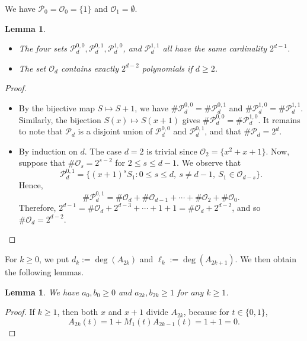 \documentclass [12pt]{article}
\newtheorem{lemma}[theorem]{Lemma}
\begin{document}
We have ${\mathcal{P}}_0 = {\mathcal{O}}_0 = \{1\}$ and ${\mathcal{O}}_1 = \emptyset$.

\begin{lemma} \label{oddpolyn}
\begin{itemize}
    \item[i)] The four sets ${\mathcal{P}}^{0,0}_d, {\mathcal{P}}^{0,1}_d, {\mathcal{P}}^{1,0}_d$, and ${\mathcal{P}}^{1,1}_d$ all have the same cardinality $2^{d-1}$.
    \item[ii)] The set ${\mathcal{O}}_d$ contains exactly $2^{d-2}$ polynomials if $d \geq 2$.
\end{itemize}
\end{lemma}

\begin{proof}
\begin{itemize}
    \item[i)] By the bijective map $S \mapsto S+1$, we have $\# {\mathcal{P}}^{0,0}_d = \# {\mathcal{P}}^{0,1}_d$ and $\# {\mathcal{P}}^{1,0}_d = \# {\mathcal{P}}^{1,1}_d$. Similarly, the bijection $S(x) \mapsto S(x+1)$ gives $\# {\mathcal{P}}^{0,0}_d = \# {\mathcal{P}}^{1,0}_d$. It remains to note that ${\mathcal{P}}_d$ is a disjoint union of ${\mathcal{P}}^{0,0}_d$ and ${\mathcal{P}}^{0,1}_d$, and that $\# {\mathcal{P}}_d = 2^d$.
    
    \item[ii)] By induction on $d$. The case $d = 2$ is trivial since ${\mathcal{O}}_2 = \{x^2 + x + 1\}$. Now, suppose that $\# {\mathcal{O}}_s = 2^{s-2}$ for $2 \leq s \leq d-1$. We observe that
    \[
    {\mathcal{P}}^{0,1}_d = \{(x+1)^s S_1 : 0 \leq s \leq d, \ s \neq d-1, \ S_1 \in {\mathcal{O}}_{d-s}\}.
    \]
    Hence,
    \[
    \# {\mathcal{P}}^{0,1}_d = \# {\mathcal{O}}_d + \# {\mathcal{O}}_{d-1} + \cdots + \# {\mathcal{O}}_2 + \# {\mathcal{O}}_0.
    \]
    Therefore, $2^{d-1} = \# {\mathcal{O}}_d + 2^{d-3} + \cdots + 1 + 1 = \# {\mathcal{O}}_d + 2^{d-2}$, and so $\# {\mathcal{O}}_d = 2^{d-2}$.
\end{itemize}
\end{proof}

For $k \geq 0$, we put $d_k := \deg(A_{2k})$ and $\ell_k := \deg(A_{2k+1})$.  
We then obtain the following lemmas.

\begin{lemma} \label{lesakbk}
We have $a_0, b_0 \geq 0$ and $a_{2k}, b_{2k} \geq 1$ for any $k \geq 1$.
\end{lemma}

\begin{proof}
If $k \geq 1$, then both $x$ and $x+1$ divide $A_{2k}$, because for $t \in \{0,1\}$,
\[
A_{2k}(t) = 1+M_1(t) A_{2k-1}(t) = 1 + 1 = 0.
\]
\end{proof}
\end{document}
